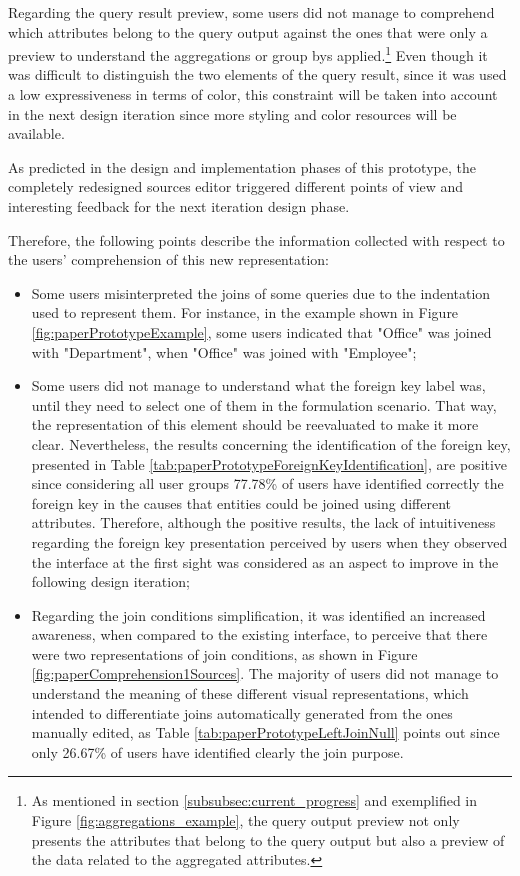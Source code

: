 Regarding the query result preview, some users did not manage to comprehend which attributes belong to the query output against the ones that were only a preview to understand the aggregations or group bys applied.\footnote{As mentioned in section \ref{subsubsec:current_progress} and exemplified in Figure \ref{fig:aggregations_example}, the query output preview not only presents the attributes that belong to the query output but also a preview of the data related to the aggregated attributes.} 
Even though it was difficult to distinguish the two elements of the query result, since it was used a low expressiveness in terms of color, this constraint will be taken into account in the next design iteration since more styling and color resources will be available.

As predicted in the design and implementation phases of this prototype, the completely redesigned sources editor triggered different points of view and interesting feedback for the next iteration design phase.

Therefore, the following points describe the information collected with respect to the users' comprehension of this new representation:

\begin{itemize}
  \item Some users misinterpreted the joins of some queries due to the indentation used to represent them. For instance, in the example shown in Figure \ref{fig:paperPrototypeExample}, some users indicated that "Office" was joined with "Department", when "Office" was joined with "Employee";
  \item Some users did not manage to understand what the foreign key label was, until they need to select one of them in the formulation scenario. That way, the representation of this element should be reevaluated to make it more clear. Nevertheless, the results concerning the identification of the foreign key, presented in Table \ref{tab:paperPrototypeForeignKeyIdentification}, are positive since considering all user groups 77.78\% of users have identified correctly the foreign key in the causes that entities could be joined using different attributes. Therefore, although the positive results, the lack of intuitiveness regarding the foreign key presentation perceived by users when they observed the interface at the first sight was considered as an aspect to improve in the following design iteration;
  \item Regarding the join conditions simplification, it was identified an increased awareness, when compared to the existing interface, to perceive that there were two representations of join conditions, as shown in Figure \ref{fig:paperComprehension1Sources}. The majority of users did not manage to understand the meaning of these different visual representations, which intended to differentiate joins automatically generated from the ones manually edited, as Table \ref{tab:paperPrototypeLeftJoinNull} points out since only 26.67\% of users have identified clearly the join purpose.
\end{itemize}

